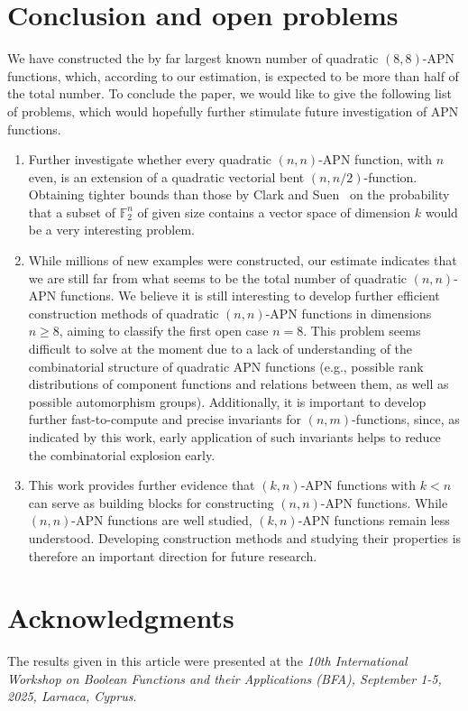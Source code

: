 \documentclass{amsart}[11pt]
\theoremstyle{plain}
\theoremstyle{definition}
\numberwithin{theorem}{section}
\numberwithin{equation}{section}
\numberwithin{table}{section}
\numberwithin{figure}{section}
\numberwithin{algorithm}{section}
\def\F{\mathbb F}
\begin{document}
\section{Conclusion and open problems}\label{sec:concl_op}
We have constructed the by far largest known number of quadratic $(8,8)$-APN functions, which, according to our estimation, is expected to be more than half of the total number. To conclude the paper, we would like to give the following list of problems, which would hopefully further stimulate future investigation of APN functions.
\begin{enumerate}
	\item Further investigate whether every quadratic $(n,n)$-APN function, with $n$ even, is an extension of a quadratic vectorial bent $(n,n/2)$-function. Obtaining tighter bounds than those by Clark and Suen~\cite{clark1999probability} on the probability that a subset of $\F_2^n$ of given size contains a vector space of dimension $k$ would be a very interesting problem.
	\item While millions of new examples were constructed, our estimate indicates that we are still far from what seems to be the total number of quadratic $(n,n)$-APN functions. We believe it is still interesting to develop further efficient construction methods of quadratic $(n,n)$-APN functions in dimensions $n \ge 8$, aiming to classify the first open case $n=8$. This problem seems difficult to solve at the moment due to a lack of understanding of the combinatorial structure of quadratic APN functions (e.g., possible rank distributions of component functions and relations between them, as well as possible automorphism groups). Additionally, it is important to develop further fast-to-compute and precise invariants for $(n,m)$-functions, since, as indicated by this work, early application of such invariants helps to reduce the combinatorial explosion early.
	\item This work provides further evidence that $(k,n)$-APN functions with $k<n$ can serve as building blocks for constructing $(n,n)$-APN functions. While $(n,n)$-APN functions are well studied, $(k,n)$-APN functions remain less understood. Developing construction methods and studying their properties is therefore an important direction for future research.
\end{enumerate}

\section*{Acknowledgments}
The results given in this article were presented at the \emph{10th International Workshop on Boolean Functions and their Applications (BFA), September 1-5, 2025, Larnaca, Cyprus}.
\end{document}
